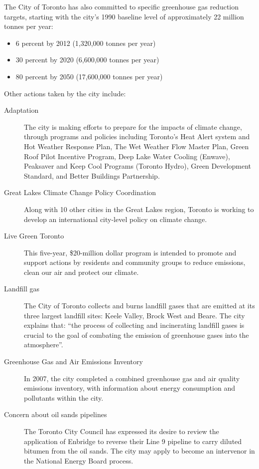 \begin{itemize}
The City of Toronto has also committed to specific greenhouse gas reduction targets, starting with the city's 1990 baseline level of approximately 22 million tonnes per year:\cite{TorontoAQandCC}
\begin{itemize}
	\item 6 percent by 2012 (1,320,000 tonnes per year)
	\item 30 percent by 2020 (6,600,000 tonnes per year)
	\item 80 percent by 2050 (17,600,000 tonnes per year)
\end{itemize}

Other actions taken by the city include:
\begin{description}
	\item [Adaptation] The city is making efforts to prepare for the impacts of climate change, through programs and policies including Toronto’s Heat Alert system and Hot Weather Response Plan, The Wet Weather Flow Master Plan, Green Roof Pilot Incentive Program, Deep Lake Water Cooling (Enwave), Peaksaver and Keep Cool Programs (Toronto Hydro), Green Development Standard, and Better Buildings Partnership.
	\item [Great Lakes Climate Change Policy Coordination] Along with 10 other cities in the Great Lakes region, Toronto is working to develop an international city-level policy on climate change.
	\item [Live Green Toronto] This  five-year, \$20-million dollar program is intended to promote and support actions by residents and community groups to reduce emissions, clean our air and protect our climate.
	\item [Landfill gas] The City of Toronto collects and burns landfill gases that are emitted at its three largest landfill sites: Keele Valley, Brock West and Beare. The city explains that: ``the process of collecting and incinerating landfill gases is crucial to the goal of combating the emission of greenhouse gases into the atmosphere''.\cite{TorontoAQandCC}
	\item [Greenhouse Gas and Air Emissions Inventory] In 2007, the city completed a combined greenhouse gas and air quality emissions inventory, with information about energy consumption and pollutants within the city. 
	\item [Concern about oil sands pipelines] The Toronto City Council has expressed its desire to review the application of Enbridge to reverse their Line 9 pipeline to carry diluted bitumen from the oil sands. 
	The city may apply to become an intervenor in the National Energy Board process.
\end{description}




\end{itemize}

